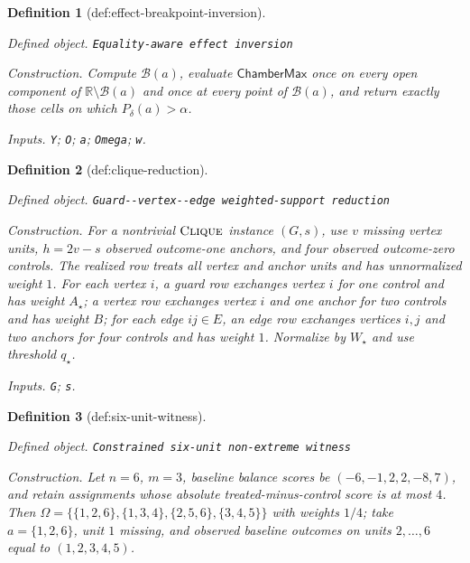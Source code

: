 \documentclass{article}
\newtheorem{definition}{Definition}
\begin{document}
\begin{definition}[def:effect-breakpoint-inversion]\label{def:effect-breakpoint-inversion}
\par\smallskip\noindent\emph{Defined object.} \texttt{Equality-\allowbreak{}aware effect inversion}
\par\smallskip\noindent\emph{Construction.} Compute \(\mathcal B(a)\), evaluate \(\mathsf{ChamberMax}\) once on every open component of \(\mathbb R\setminus\mathcal B(a)\) and once at every point of \(\mathcal B(a)\), and return exactly those cells on which \(P_\delta(a)>\alpha\).
\par\smallskip\noindent\emph{Inputs.} \texttt{Y}; \texttt{O}; \texttt{a}; \texttt{Omega}; \texttt{w}.
\end{definition}

\begin{definition}[def:clique-reduction]\label{def:clique-reduction}
\par\smallskip\noindent\emph{Defined object.} \texttt{Guard-\allowbreak{}-\allowbreak{}vertex-\allowbreak{}-\allowbreak{}edge weighted-\allowbreak{}support reduction}
\par\smallskip\noindent\emph{Construction.} For a nontrivial \(\textsc{Clique}\) instance \((G,s)\), use \(v\) missing vertex units, \(h=2v-s\) observed outcome-one anchors, and four observed outcome-zero controls. The realized row treats all vertex and anchor units and has unnormalized weight \(1\). For each vertex \(i\), a guard row exchanges vertex \(i\) for one control and has weight \(A_\star\); a vertex row exchanges vertex \(i\) and one anchor for two controls and has weight \(B\); for each edge \(ij\in E\), an edge row exchanges vertices \(i,j\) and two anchors for four controls and has weight \(1\). Normalize by \(W_\star\) and use threshold \(q_\star\).
\par\smallskip\noindent\emph{Inputs.} \texttt{G}; \texttt{s}.
\end{definition}

\begin{definition}[def:six-unit-witness]\label{def:six-unit-witness}
\par\smallskip\noindent\emph{Defined object.} \texttt{Constrained six-\allowbreak{}unit non-\allowbreak{}extreme witness}
\par\smallskip\noindent\emph{Construction.} Let \(n=6\), \(m=3\), baseline balance scores be \((-6,-1,2,2,-8,7)\), and retain assignments whose absolute treated-minus-control score is at most \(4\). Then \(\Omega=\{\{1,2,6\},\{1,3,4\},\{2,5,6\},\{3,4,5\}\}\) with weights \(1/4\); take \(a=\{1,2,6\}\), unit \(1\) missing, and observed baseline outcomes on units \(2,\ldots,6\) equal to \((1,2,3,4,5)\).
\end{definition}
\end{document}
